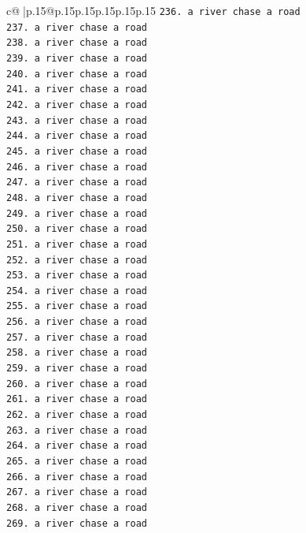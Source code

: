 \documentclass{article}
\begin{document}
{\begin{supertabular}{c@{$\;$}|p{.15\linewidth}@{}p{.15\linewidth}p{.15\linewidth}p{.15\linewidth}p{.15\linewidth}p{.15\linewidth}}
{{{\texttt{236. a river chase a road} \\
\texttt{237. a river chase a road} \\
\texttt{238. a river chase a road} \\
\texttt{239. a river chase a road} \\
\texttt{240. a river chase a road} \\
\texttt{241. a river chase a road} \\
\texttt{242. a river chase a road} \\
\texttt{243. a river chase a road} \\
\texttt{244. a river chase a road} \\
\texttt{245. a river chase a road} \\
\texttt{246. a river chase a road} \\
\texttt{247. a river chase a road} \\
\texttt{248. a river chase a road} \\
\texttt{249. a river chase a road} \\
\texttt{250. a river chase a road} \\
\texttt{251. a river chase a road} \\
\texttt{252. a river chase a road} \\
\texttt{253. a river chase a road} \\
\texttt{254. a river chase a road} \\
\texttt{255. a river chase a road} \\
\texttt{256. a river chase a road} \\
\texttt{257. a river chase a road} \\
\texttt{258. a river chase a road} \\
\texttt{259. a river chase a road} \\
\texttt{260. a river chase a road} \\
\texttt{261. a river chase a road} \\
\texttt{262. a river chase a road} \\
\texttt{263. a river chase a road} \\
\texttt{264. a river chase a road} \\
\texttt{265. a river chase a road} \\
\texttt{266. a river chase a road} \\
\texttt{267. a river chase a road} \\
\texttt{268. a river chase a road} \\
\texttt{269. a river chase a road} \\
}}}
\end{supertabular}}
\end{document}
